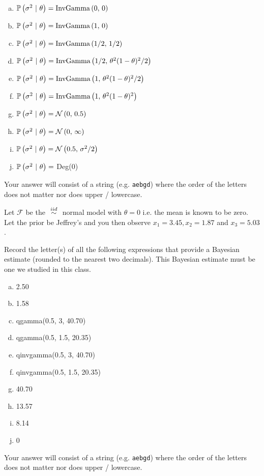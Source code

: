 \documentclass[12pt]{article}
\newcommand{\instr}{Your answer will consist of a string (e.g. \texttt{aebgd}) where the order of the letters does not matter nor does upper / lowercase.}
\begin{document}
\begin{enumerate}[(a)]
\item $\mathbb{P}\left(\sigma^2~|~\theta\right) = \text{InvGamma}\left(0,\,0\right)$
\item $\mathbb{P}\left(\sigma^2~|~\theta\right) = \text{InvGamma}\left(1,\,0\right)$
\item $\mathbb{P}\left(\sigma^2~|~\theta\right) = \text{InvGamma}\left(1/2,\,1/2\right)$
\item $\mathbb{P}\left(\sigma^2~|~\theta\right) = \text{InvGamma}\left(1/2,\,\theta^2(1-\theta)^2/2\right)$
\item $\mathbb{P}\left(\sigma^2~|~\theta\right) = \text{InvGamma}\left(1,\,\theta^2(1-\theta)^2/2\right)$
\item $\mathbb{P}\left(\sigma^2~|~\theta\right) = \text{InvGamma}\left(1,\,\theta^2(1-\theta)^2\right)$
\item $\mathbb{P}\left(\sigma^2~|~\theta\right) = \mathcal{N}\left(0,\,0.5\right)$
\item $\mathbb{P}\left(\sigma^2~|~\theta\right) = \mathcal{N}\left(0,\,\infty\right)$
\item $\mathbb{P}\left(\sigma^2~|~\theta\right) = \mathcal{N}\left(0.5,\,\sigma^2 / 2\right)$
\item $\mathbb{P}\left(\sigma^2~|~\theta\right) = $ Deg(0)
\end{enumerate}
\eenum\instr\pagebreak



\problem [8min] Let $\mathcal{F}$ be the $\iid$ normal model with $\theta = 0$ i.e. the mean is known to be zero. Let the prior be Jeffrey's and you then observe $x_1 = 3.45, x_2 = 1.87$ and $x_3 = 5.03$.

\benum

 Record the letter(s) of all the following expressions that provide a Bayesian estimate (rounded to the nearest two decimals). This Bayesian estimate must be one we studied in this class.

\begin{enumerate}[(a)]
\item 2.50
\item 1.58
\item qgamma(0.5, 3, 40.70)
\item qgamma(0.5, 1.5, 20.35)
\item qinvgamma(0.5, 3, 40.70)
\item qinvgamma(0.5, 1.5, 20.35) %
\item 40.70 %
\item 13.57
\item 8.14 %
\item 0
\end{enumerate}
\eenum\instr\pagebreak

\end{document}
